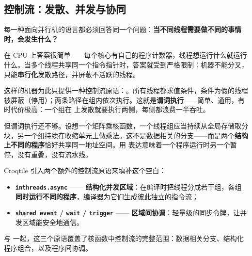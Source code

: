 \subsection*{控制流：发散、并发与协同}

每一种面向并行机的语言都必须回答同一个问题：\textbf{当不同线程需要做不同的事情时，会发生什么？}

在 CPU 上答案很简单——每个核心有自己的程序计数器，线程想运行什么就运行什么。当多个线程共享同一个指令指针时，答案就受到严格限制：机器不能分叉，只能\textbf{串行化}发散路径，并屏蔽不活跃的线程。

这样的机器为此只提供一种控制流原语：\co@if@。所有线程都求值条件，条件为假的线程被屏蔽（停用）；两条路径在组内依次执行。这就是\textbf{谓词执行}——简单、通用，有时代价极高：一个组在 \co@if@ 上发散就要执行两侧，每侧都浪费一半吞吐。

但谓词执行还不够。设想一个矩阵乘核函数，一个线程组应当持续从全局存储取分块，另一个组持续在收缩单元上做乘法。这不是数据相关的分支——而是两个\textbf{结构上不同的程序}恰好共享同一地址空间。用 \co@if@ 表达意味着一个程序运行时另一个暂停，没有重叠，没有流水线。

Croqtile 引入两个额外的控制流原语来填补这个空白：

\begin{itemize}[leftmargin=1.6em]
\item \textbf{\texttt{inthreads.async}} —— \textbf{结构化并发区域}：在编译时把线程分成若干组，各组\textbf{同时运行不同的程序}，编译器为它们生成彼此独立的指令流；
\item \textbf{\texttt{shared event} / \texttt{wait} / \texttt{trigger}} —— \textbf{区域间协调}：轻量级的同步令牌，让并发区域能安全地通信。
\end{itemize}

与 \co@if@ 一起，这三个原语覆盖了核函数中控制流的完整范围：数据相关分支、结构化程序组合，以及程序间协调。
